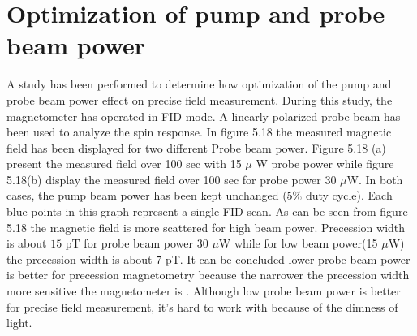    \section{Optimization of pump and probe beam power} 
 A study has been performed to determine how optimization of the pump and probe beam power effect on precise field measurement.  During this study, the magnetometer has operated in FID mode.  A  linearly polarized probe beam has been used to analyze the spin response. In figure 5.18 the measured magnetic field has been displayed for two different  Probe beam power. Figure 5.18 (a) present the measured field over 100 sec with 15 $\mu$ W probe power while figure 5.18(b) display the measured field over 100 sec for probe power 30 $\mu$W. In both cases, the pump beam power has been kept unchanged ($5\%$ duty cycle). Each blue points in this graph represent a single FID scan. As can be seen from figure 5.18 the magnetic field is more scattered for high beam power. Precession width is about $15$ pT for probe beam power 30 $\mu$W while for low beam power(15 $\mu$W) the precession width is about $7$ pT. It can be concluded lower probe beam power is better for precession  magnetometry because the narrower the precession width more sensitive the magnetometer is . Although low probe beam power is better for precise field measurement, it's hard to work with because of the dimness of light.\\
